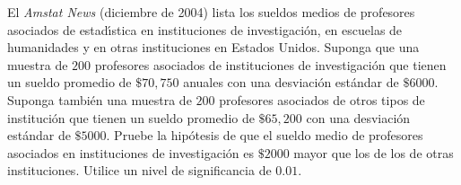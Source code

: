 \begin{enunciado}
 El \textit{Amstat News} (diciembre de 2004) lista los sueldos medios de profesores asociados de estad\'{\i}stica en instituciones de investigaci\'on, en escuelas de humanidades y en otras instituciones en Estados Unidos. Suponga que una muestra de $200$ profesores asociados de instituciones de investigaci\'on que tienen un sueldo promedio de $\$70,750$ anuales con una desviaci\'on est\'andar de $\$6000$. Suponga tambi\'en una muestra de $200$ profesores asociados de otros tipos de instituci\'on que tienen un sueldo promedio de $\$65,200$ con una desviaci\'on est\'andar de $\$5000$. Pruebe la hip\'otesis de que el sueldo medio de profesores asociados en instituciones de investigaci\'on es $\$2000$ mayor que los de los de otras instituciones. Utilice un nivel de significancia de $0.01$.
\end{enunciado}

